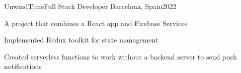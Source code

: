 \resumeProject
  {UnwindTime}{Full Stack Developer}
  {Barcelona, Spain}{2022}
  \resumeItemListStart
\item A project that combines a React app and Firebase Services
\item Implemented Redux toolkit for state management
\item Created serverless functions to work without a backend server to send push notifications
  \resumeItemListEnd 